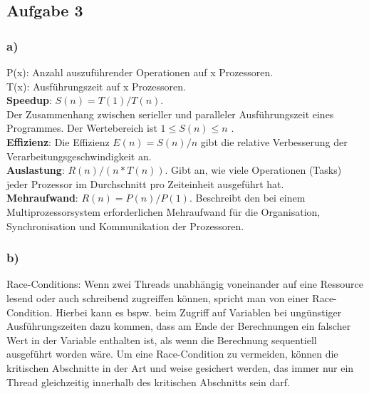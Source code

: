 \documentclass{article}
\begin{document}
    \subsection{Aufgabe 3}
    
        \subsubsection{a)}
        P(x): Anzahl auszuführender Operationen auf x Prozessoren.\\
        T(x): Ausführungszeit auf x Prozessoren.\\
        
        \textbf{Speedup}:  $S(n) = T(1)/T(n) $. \\ Der Zusammenhang zwischen serieller und paralleler Ausführungszeit eines Programmes. Der Wertebereich ist $ 1 \leq S(n) \leq n $ .\\
        
        \textbf{Effizienz}: Die Effizienz $ E(n) = S(n)/n $ gibt die relative Verbesserung der Verarbeitungsgeschwindigkeit an.\\
        
        \textbf{Auslastung}: $ R(n)/(n*T(n)) $. Gibt an, wie viele Operationen (Tasks) jeder Prozessor im Durchschnitt pro Zeiteinheit ausgeführt hat.\\
        
        \textbf{Mehraufwand}: $ R(n) = P(n)/P(1) $. Beschreibt den bei einem Multiprozessorsystem erforderlichen Mehraufwand für die Organisation, Synchronisation und Kommunikation der Prozessoren.\\
        
        \subsubsection{b)}
        Race-Conditions: Wenn zwei Threads unabhängig voneinander auf eine Ressource lesend oder auch schreibend zugreiffen können, 
        spricht man von einer Race-Condition. Hierbei kann es bspw. beim Zugriff auf Variablen bei ungünstiger Ausführungszeiten
        dazu kommen, dass am Ende der Berechnungen ein falscher Wert in der Variable enthalten ist, als wenn die Berechnung sequentiell 
        ausgeführt worden wäre.
        Um eine Race-Condition zu vermeiden, können die kritischen Abschnitte in der Art und weise gesichert werden, das immer nur ein 
        Thread gleichzeitig innerhalb des kritischen Abschnitts sein darf.
\end{document}
